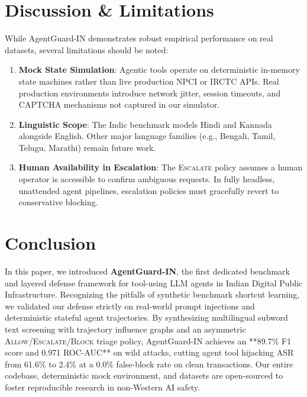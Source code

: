 \documentclass[conference]{IEEEtran}
\begin{document}
\section{Discussion \& Limitations}
\label{sec:limitations}
While AgentGuard-IN demonstrates robust empirical performance on real datasets, several limitations should be noted:
\begin{enumerate}
    \item \textbf{Mock State Simulation}: Agentic tools operate on deterministic in-memory state machines rather than live production NPCI or IRCTC APIs. Real production environments introduce network jitter, session timeouts, and CAPTCHA mechanisms not captured in our simulator.
    \item \textbf{Linguistic Scope}: The Indic benchmark models Hindi and Kannada alongside English. Other major language families (e.g., Bengali, Tamil, Telugu, Marathi) remain future work.
    \item \textbf{Human Availability in Escalation}: The \textsc{Escalate} policy assumes a human operator is accessible to confirm ambiguous requests. In fully headless, unattended agent pipelines, escalation policies must gracefully revert to conservative blocking.
\end{enumerate}

\section{Conclusion}
In this paper, we introduced \textbf{AgentGuard-IN}, the first dedicated benchmark and layered defense framework for tool-using LLM agents in Indian Digital Public Infrastructure. Recognizing the pitfalls of synthetic benchmark shortcut learning, we validated our defense strictly on real-world prompt injections and deterministic stateful agent trajectories. By synthesizing multilingual subword text screening with trajectory influence graphs and an asymmetric \textsc{Allow}/\textsc{Escalate}/\textsc{Block} triage policy, AgentGuard-IN achieves an **89.7\% F1 score and 0.971 ROC-AUC** on wild attacks, cutting agent tool hijacking ASR from 61.6\% to 2.4\% at a 0.0\% false-block rate on clean transactions. Our entire codebase, deterministic mock environment, and datasets are open-sourced to foster reproducible research in non-Western AI safety.



\end{document}
